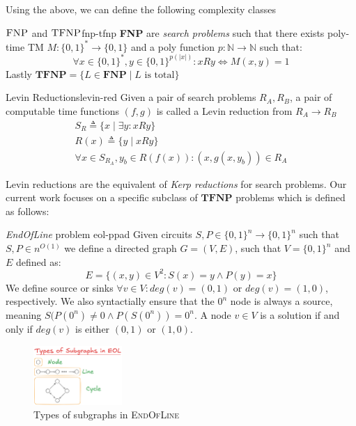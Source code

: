 Using the above, we can define the following complexity classes

\begin{definitionbox}{$\textnormal{\textsc{FNP}}$ and $\textnormal{\textsc{TFNP}}$}{fnp-tfnp}
    \textbf{FNP} are \textit{search problems} such that there exists poly-time TM $M: \{0,1\}^* \to \{0,1\}$
    and a poly function $p : \mathbb{N} \to \mathbb{N}$ such that:
    $$
    \forall x \in \{0,1\}^*, y \in \{0,1\}^{p(|x|)}: xRy \iff M(x,y) = 1
    $$
    Lastly $\textbf{TFNP} = \{L \in \textbf{FNP} \mid L \text{ is total}\}$
\end{definitionbox}


\begin{definitionbox}{Levin Reductions}{levin-red}
    Given a pair of search problems $R_A, R_B$, a pair of
    computable time functions $(f,g)$ is called a Levin reduction from $R_A \to R_B$
    \begin{gather*}
        S_R \triangleq \{x \mid \exists y : xRy  \}\\
        R(x) \triangleq \{y \mid x Ry \} \\
        \forall x \in S_{R_A}, y_b \in R(f(x)):  (x , g(x, y_b)) \in R_A
    \end{gather*}
\end{definitionbox}


Levin reductions are the equivalent of \textit{Kerp reductions} for search
problems. Our current work focuses on a specific subclass of $\textbf{TFNP}$ problems
which is defined as follows:

\begin{definitionbox}{\textit{EndOfLine} problem \cite{papadimitriou_ComplexityParityArgument_1994}}{eol-ppad}
    Given circuits $S, P \in \{0,1\}^n \to \{0,1\}^n$ such that $S,P \in n^{O(1)}$
    we define a directed graph $G = (V,E)$, such that $V= \{0,1\}^n$ and $E$ defined as:
    $$
    E = \{(x,y) \in V^2: S(x) = y \wedge P(y) = x\}
    $$
    We define source or sinks $\forall v \in V: \textit{deg}(v) = (0,1)$ or
    $\textit{deg}(v) = (1,0)$, respectively. 
    We also syntactially ensure that the $0^n$ node is always a source, meaning
    $S(P(0^n) \neq 0 \wedge P(S(0^n)) = 0^n$.
    A node $v \in V$ is a solution if and only if $\textit{deg}(v)$ is either
    $(0,1)$  or $(1,0)$.
\end{definitionbox}


\begin{figure}[h!]
    \centering
    \includegraphics[width=0.3\textwidth]{assets/eol-subgraphs.png}
    \caption{Types of subgraphs in \textsc{EndOfLine}}\label{fig:eol-subgraphs}
\end{figure}


